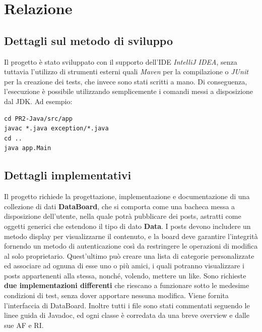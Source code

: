 \documentclass[10pt, italian, openany]{book}
\begin{document}
\chapter*{Relazione}

\section{Dettagli sul metodo di sviluppo}
Il progetto è stato sviluppato con il supporto dell'IDE \textit{IntelliJ IDEA}, senza tuttavia l'utilizzo di strumenti esterni quali \textit{Maven} per la compilazione o \textit{JUnit} per la creazione dei tests, che invece sono stati scritti a mano. Di conseguenza, l'esecuzione è possibile utilizzando semplicemente i comandi messi a disposizione dal JDK. Ad esempio:

\begin{lstlisting}[style=bash]
cd PR2-Java/src/app
javac *.java exception/*.java
cd ..
java app.Main
\end{lstlisting}

\section{Dettagli implementativi}
Il progetto richiede  la progettazione, implementazione e documentazione di una collezione di dati \textbf{DataBoard}, che si comporta come una bacheca messa a disposizione dell'utente, nella quale potrà pubblicare dei posts, astratti come oggetti generici che estendono il tipo di dato \textbf{Data}. I posts devono includere un metodo display per visualizzarne il contenuto, e la board deve garantire l'integrità fornendo un metodo di autenticazione così da restringere le operazioni di modifica al solo proprietario. Quest'ultimo può creare una lista di categorie personalizzate ed associare ad ognuna di esse uno o più amici, i quali potranno visualizzare i posts appartenenti alla stessa, nonché, volendo, mettere un like. Sono richieste \textbf{due implementazioni differenti} che riescano a funzionare sotto le medesime condizioni di test, senza dover apportare nessuna modifica. Viene fornita l'interfaccia di DataBoard. Inoltre tutti i file sono stati commentati seguendo le linee guida di Javadoc, ed ogni classe è corredata da una breve overview e dalle sue AF e RI.
\end{document}
